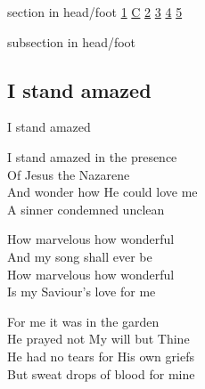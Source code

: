 \documentclass{beamer}
\begin{document}
{
{ 
 {
 \begin{beamercolorbox}[ht=4.5ex,dp=1.5ex,%
      leftskip=.3cm,rightskip=.3cm plus1fil]{section in head/foot}
 \fontsize{12}{25}\selectfont 
\hyperlink{I stand amazed['How marvelous']1}{1}
\hyperlink{I stand amazed['How marvelous']C}{C}
\hyperlink{I stand amazed['How marvelous']2}{2}
\hyperlink{I stand amazed['How marvelous']3}{3}
\hyperlink{I stand amazed['How marvelous']4}{4}
\hyperlink{I stand amazed['How marvelous']5}{5}
 
 \end{beamercolorbox}%
  \begin{beamercolorbox}[ht=2.5ex,dp=1.125ex,%
   leftskip=.3cm,rightskip=.3cm plus1fil]{subsection in head/foot}
   \insertauthor
 \end{beamercolorbox}%
 }
}
\subsection{ I stand amazed }

\hypertarget{I stand amazed['How marvelous']1}{}
\begin{frame}{I stand amazed }
\fontsize{ 20 }{ 27 }\selectfont

I stand amazed in the presence\\ 
Of Jesus the Nazarene\\ 
And wonder how He could love me\\ 
A sinner condemned unclean 

\end{frame}

\hypertarget{I stand amazed['How marvelous']C}{}
\begin{frame}{}
\fontsize{ 20 }{ 27 }\selectfont

How marvelous how wonderful\\ 
And my song shall ever be\\ 
How marvelous how wonderful\\ 
Is my Saviour's love for me 

\end{frame}

\hypertarget{I stand amazed['How marvelous']2}{}
\begin{frame}{}
\fontsize{ 20 }{ 27 }\selectfont

For me it was in the garden\\ 
He prayed not My will but Thine\\ 
He had no tears for His own griefs\\ 
But sweat drops of blood for mine 


\end{frame}}
\end{document}
